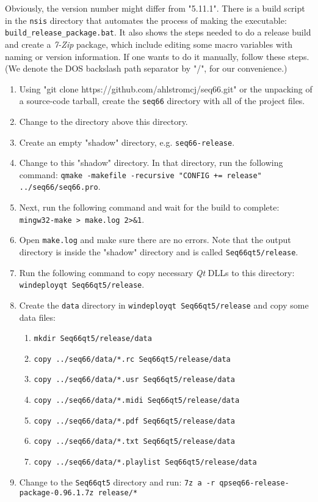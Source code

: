    Obviously, the version number might differ from "5.11.1".
   There is a build script in the \texttt{nsis} directory that
   automates the process of making the executable:
   \texttt{build\_release\_package.bat}.
   It also shows the steps needed to do a release build and create a
   \textsl{7-Zip} package, which include editing some macro variables with
   naming or version information.  If one wants to do it manually,
   follow these steps.  (We denote the DOS backslash path separator
   by "/", for our convenience.)

   \begin{enumerate}
      \item Using
         "git clone https://github.com/ahlstromcj/seq66.git"
         or the unpacking of a source-code tarball,
         create the \texttt{seq66} directory with all
         of the project files.
      \item Change to the directory above this directory.
      \item Create an empty "shadow" directory, e.g. \texttt{seq66-release}.
      \item Change to this "shadow" directory.  In that directory, run the
         following command:
         \texttt{qmake -makefile -recursive "CONFIG += release"
            ../seq66/seq66.pro}.
      \item Next, run the following command and wait for the build to
         complete:
         \texttt{mingw32-make > make.log 2>\&1}.
      \item Open \texttt{make.log} and make sure there are no errors.
         Note that the output directory is inside the "shadow" directory and
         is called \texttt{Seq66qt5/release}.
      \item Run the following command to copy necessary \textsl{Qt} DLLs to
         this directory: \linebreak
         \texttt{windeployqt Seq66qt5/release}.
      \item Create the \texttt{data} directory in
         \texttt{windeployqt Seq66qt5/release} and copy some data files:
         \begin{enumerate}
            \item \texttt{mkdir Seq66qt5/release/data}
            \item \texttt{copy ../seq66/data/*.rc Seq66qt5/release/data}
            \item \texttt{copy ../seq66/data/*.usr Seq66qt5/release/data}
            \item \texttt{copy ../seq66/data/*.midi Seq66qt5/release/data}
            \item \texttt{copy ../seq66/data/*.pdf Seq66qt5/release/data}
            \item \texttt{copy ../seq66/data/*.txt Seq66qt5/release/data}
            \item \texttt{copy ../seq66/data/*.playlist Seq66qt5/release/data}
         \end{enumerate}
      \item Change to the \texttt{Seq66qt5} directory and run:
         \texttt{7z a -r qpseq66-release-package-0.96.1.7z \linebreak release/*}
   \end{enumerate}

